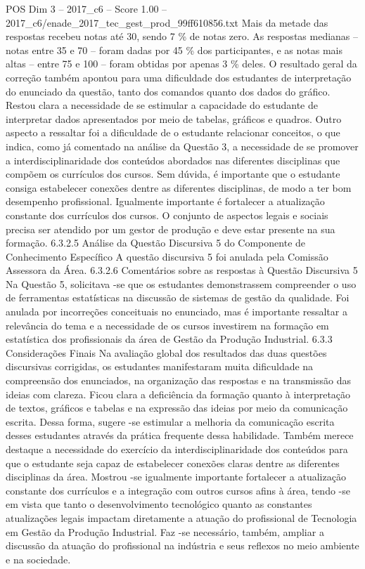 \begin{textsample}{POS Dim 3 – 2017\_c6 – Score 1.00 – 2017\_c6/enade\_2017\_tec\_gest\_prod\_99ff610856.txt}
Mais da metade das respostas recebeu notas até 30, sendo 7 \% de notas zero.
As respostas medianas – notas entre 35 e 70 – foram dadas por 45 \% dos participantes, e as notas mais altas – entre 75 e 100 – foram obtidas por apenas 3 \% deles.
O resultado geral da correção também apontou para uma dificuldade dos estudantes de interpretação do enunciado da questão, tanto dos comandos quanto dos dados do gráfico.
Restou clara a necessidade de se estimular a capacidade do estudante de interpretar dados apresentados por meio de tabelas, gráficos e quadros.
Outro aspecto a ressaltar foi a dificuldade de o estudante relacionar conceitos, o que indica, como já comentado na análise da Questão 3, a necessidade de se promover a interdisciplinaridade dos conteúdos abordados nas diferentes disciplinas que compõem os currículos dos cursos.
Sem dúvida, é importante que o estudante consiga estabelecer conexões dentre as diferentes disciplinas, de modo a ter bom desempenho profissional.
Igualmente importante é fortalecer a atualização constante dos currículos dos cursos.
O conjunto de aspectos legais e sociais precisa ser atendido por um gestor de produção e deve estar presente na sua formação. 6.3.2.5 Análise da Questão Discursiva 5 do Componente de Conhecimento Específico A questão discursiva 5 foi anulada pela Comissão Assessora da Área. 6.3.2.6 Comentários sobre as respostas à Questão Discursiva 5 Na Questão 5, solicitava -se que os estudantes demonstrassem compreender o uso de ferramentas estatísticas na discussão de sistemas de gestão da qualidade.
Foi anulada por incorreções conceituais no enunciado, mas é importante ressaltar a relevância do tema e a necessidade de os cursos investirem na formação em estatística dos profissionais da área de Gestão da Produção Industrial. 6.3.3 Considerações Finais Na avaliação global dos resultados das duas questões discursivas corrigidas, os estudantes manifestaram muita dificuldade na compreensão dos enunciados, na organização das respostas e na transmissão das ideias com clareza.
Ficou clara a deficiência da formação quanto à interpretação de textos, gráficos e tabelas e na expressão das ideias por meio da comunicação escrita.
Dessa forma, sugere -se estimular a melhoria da comunicação escrita desses estudantes através da prática frequente dessa habilidade.
Também merece destaque a necessidade do exercício da interdisciplinaridade dos conteúdos para que o estudante seja capaz de estabelecer conexões claras dentre as diferentes disciplinas da área.
Mostrou -se igualmente importante fortalecer a atualização constante dos currículos e a integração com outros cursos afins à área, tendo -se em vista que tanto o desenvolvimento tecnológico quanto as constantes atualizações legais impactam diretamente a atuação do profissional de Tecnologia em Gestão da Produção Industrial.
Faz -se necessário, também, ampliar a discussão da atuação do profissional na indústria e seus reflexos no meio ambiente e na sociedade.

\end{textsample}
